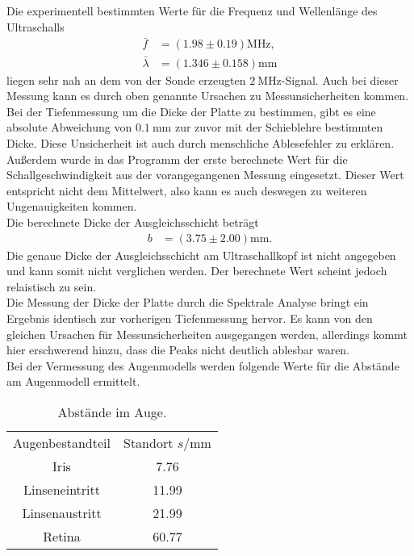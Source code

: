 Die experimentell bestimmten Werte für die Frequenz und Wellenlänge des Ultraschalls
\begin{align*}
    \bar{f} &= (1.98 \pm 0.19) \si{\mega\hertz},\\
    \bar{\lambda} &= (1.346 \pm 0.158) \si{\milli\meter}
\end{align*}
liegen sehr nah an dem von der Sonde erzeugten $\qty{2}{\mega\hertz}$-Signal.
Auch bei dieser Messung kann es durch oben genannte Ursachen zu Messunsicherheiten kommen.
Bei der Tiefenmessung um die Dicke der Platte zu bestimmen, gibt es eine absolute Abweichung von $\qty{0.1}{\milli\meter}$ zur 
zuvor mit der Schieblehre bestimmten Dicke. Diese Unsicherheit ist auch durch menschliche Ablesefehler zu erklären.
Außerdem wurde in das Programm der erste berechnete Wert für die Schallgeschwindigkeit aus der vorangegangenen Messung eingesetzt.
Dieser Wert entspricht nicht dem Mittelwert, also kann es auch deswegen zu weiteren Ungenauigkeiten kommen.\\

Die berechnete Dicke der Ausgleichsschicht beträgt
\begin{align*}
 b &= (3.75\pm 2.00) \si{\milli\meter}.   
\end{align*}
Die genaue Dicke der Ausgleichsschicht am Ultraschallkopf ist nicht angegeben und kann somit nicht verglichen werden. Der berechnete 
Wert scheint jedoch relaistisch zu sein.\\

Die Messung der Dicke der Platte durch die Spektrale Analyse bringt ein Ergebnis identisch zur vorherigen Tiefenmessung hervor.
Es kann von den gleichen Ursachen für Messunsicherheiten ausgegangen werden, allerdings kommt hier erschwerend hinzu, dass die Peaks 
nicht deutlich ablesbar waren.\\

Bei der Vermessung des Augenmodells werden folgende Werte für die Abstände am Augenmodell ermittelt.
\begin{table}[H]
    \centering
    \caption{Abstände im Auge.}
    \label{tab:Auge}
    \begin{tabular}{c S[table-format=2.2] }
    \toprule
    {Augenbestandteil} & {Standort $s / \si{\milli\meter}$} \\
    Iris            &  7.76\\
    Linseneintritt  &  11.99\\
    Linsenaustritt  &  21.99\\
    Retina          &  60.77\\
    \bottomrule
    \end{tabular}
 \end{table}

